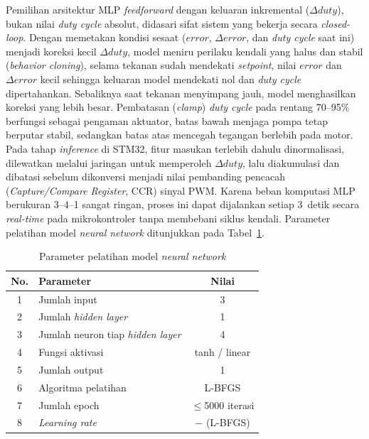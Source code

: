 Pemilihan arsitektur MLP \emph{feedforward} dengan keluaran inkremental
($\Delta duty$), bukan nilai \emph{duty cycle} absolut, didasari sifat sistem yang
bekerja secara \emph{closed-loop}. Dengan memetakan kondisi sesaat ($error$,
$\Delta error$, dan \emph{duty cycle} saat ini) menjadi koreksi kecil $\Delta duty$,
model meniru perilaku kendali yang halus dan stabil (\emph{behavior cloning}),
selama tekanan sudah mendekati \emph{setpoint}, nilai $error$ dan $\Delta error$
kecil sehingga keluaran model mendekati nol dan \emph{duty cycle} dipertahankan.
Sebaliknya saat tekanan menyimpang jauh, model menghasilkan koreksi yang lebih
besar. Pembatasan (\emph{clamp}) \emph{duty cycle} pada rentang
70--95\% berfungsi sebagai pengaman aktuator, batas bawah menjaga pompa tetap
berputar stabil, sedangkan batas atas mencegah tegangan berlebih pada motor. Pada
tahap \emph{inference} di STM32, fitur masukan terlebih dahulu dinormalisasi,
dilewatkan melalui jaringan untuk memperoleh $\Delta duty$, lalu diakumulasi dan
dibatasi sebelum dikonversi menjadi nilai pembanding pencacah (\emph{Capture/Compare
Register}, CCR) sinyal PWM. Karena beban komputasi MLP berukuran 3--4--1 sangat
ringan, proses ini dapat dijalankan setiap 3~detik secara \emph{real-time} pada
mikrokontroler tanpa membebani siklus kendali.
Parameter pelatihan model \emph{neural network} ditunjukkan pada Tabel~\ref{tab:parameter-pelatihan-nn}.

\begin{table}[H]
\centering
\caption{Parameter pelatihan model \emph{neural network}}
\label{tab:parameter-pelatihan-nn}
\begin{tabular}{|c|l|c|}
\hline
\textbf{No.} & \textbf{Parameter} & \textbf{Nilai} \\
\hline
1 & Jumlah input & 3 \\
\hline
2 & Jumlah \emph{hidden layer} & 1 \\
\hline
3 & Jumlah neuron tiap \emph{hidden layer} & 4 \\
\hline
4 & Fungsi aktivasi & tanh / linear \\
\hline
5 & Jumlah output & 1 \\
\hline
6 & Algoritma pelatihan & L-BFGS \\
\hline
7 & Jumlah epoch & $\leq$5000 iterasi \\
\hline
8 & \emph{Learning rate} & $-$ (L-BFGS) \\
\hline
\end{tabular}
\end{table}


